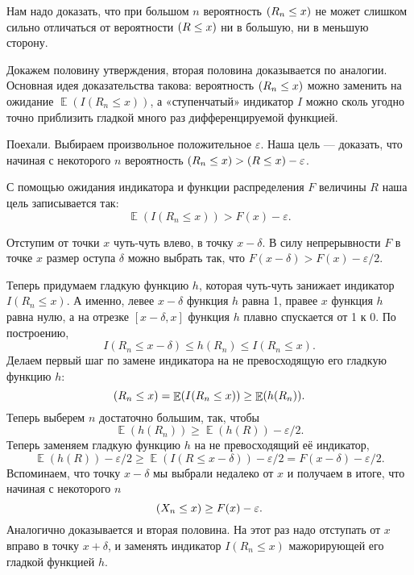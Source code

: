 \documentclass[
  letterpaper,
  DIV=11,
  numbers=noendperiod]{scrartcl}
\let\P\relax
\DeclareMathOperator{\P}{\mathbb{P}}
\DeclareMathOperator{\E}{\mathbb{E}}
\begin{document}
\begin{tcolorbox}[enhanced jigsaw, titlerule=0mm, colframe=quarto-callout-caution-color-frame, colback=white, coltitle=black, leftrule=.75mm, rightrule=.15mm, toprule=.15mm, left=2mm, breakable, bottomrule=.15mm, bottomtitle=1mm, toptitle=1mm, opacitybacktitle=0.6, title=\textcolor{quarto-callout-caution-color}{\faFire}\hspace{0.5em}{Доказательство леммы}, arc=.35mm, colbacktitle=quarto-callout-caution-color!10!white, opacityback=0]

Нам надо доказать, что при большом \(n\) вероятность \(\P(R_n\leq x)\)
не может слишком сильно отличаться от вероятности \(\P(R \leq x)\) ни в
большую, ни в меньшую сторону.

Докажем половину утверждения, вторая половина доказывается по аналогии.
Основная идея доказательства такова: вероятность \(\P(R_n \leq x)\)
можно заменить на ожидание \(\E(I(R_n \leq x))\), а «ступенчатый»
индикатор \(I\) можно сколь угодно точно приблизить гладкой много раз
дифференцируемой функцией.

Поехали. Выбираем произвольное положительное \(\varepsilon\). Наша цель
--- доказать, что начиная с некоторого \(n\) вероятность
\(\P(R_n \leq x) > \P(R \leq x) - \varepsilon\).

С помощью ожидания индикатора и функции распределения \(F\) величины
\(R\) наша цель записывается так: \[
\E(I(R_n \leq x)) > F(x) - \varepsilon.
\]

Отступим от точки \(x\) чуть-чуть влево, в точку \(x - \delta\). В силу
непрерывности \(F\) в точке \(x\) размер оступа \(\delta\) можно выбрать
так, что \(F(x-\delta) > F(x) - \varepsilon/2\).

Теперь придумаем гладкую функцию \(h\), которая чуть-чуть занижает
индикатор \(I(R_n \leq x)\). А именно, левее \(x-\delta\) функция \(h\)
равна 1, правее \(x\) функция \(h\) равна нулю, а на отрезке
\([x-\delta, x]\) функция \(h\) плавно спускается от 1 к 0. По
построению, \[
I(R_n \leq x - \delta) \leq h(R_n) \leq I(R_n \leq x).
\] Делаем первый шаг по замене индикатора на не превосходящую его
гладкую функцию \(h\): \[
\P(R_n\leq x) = \E(I(R_n \leq x)) \geq \E(h(R_n)).
\] Теперь выберем \(n\) достаточно большим, так, чтобы \[
\E(h(R_n)) \geq \E(h(R)) - \varepsilon/2. 
\] Теперь заменяем гладкую функцию \(h\) на не превосходящий её
индикатор, \[
\E(h(R)) - \varepsilon/2 \geq \E(I(R \leq x-\delta)) - \varepsilon/2 = F(x-\delta) - \varepsilon/2.
\] Вспоминаем, что точку \(x-\delta\) мы выбрали недалеко от \(x\) и
получаем в итоге, что начиная с некоторого \(n\) \[
\P(X_n \leq x) \geq F(x) - \varepsilon.
\] Аналогично доказывается и вторая половина. На этот раз надо отступать
от \(x\) вправо в точку \(x+\delta\), и заменять индикатор
\(I(R_n \leq x)\) мажорирующей его гладкой функцией \(h\).

\end{tcolorbox}
\end{document}
